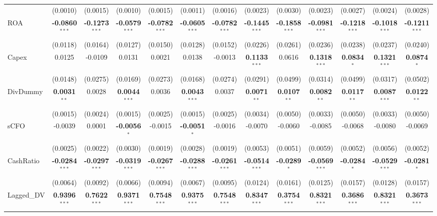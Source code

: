 \documentclass[11pt,a4paper]{article}
\begin{document}
\begin{table}[htbp]
\begin{tabular}{lcccccccccccc}
 & (0.0010) & (0.0015) & (0.0010) & (0.0015) & (0.0011) & (0.0016) & (0.0023) & (0.0030) & (0.0023) & (0.0027) & (0.0024) & (0.0028) \\
ROA & \textbf{-0.0860}$^{***}$ & \textbf{-0.1273}$^{***}$ & \textbf{-0.0579}$^{***}$ & \textbf{-0.0782}$^{***}$ & \textbf{-0.0605}$^{***}$ & \textbf{-0.0782}$^{***}$ & \textbf{-0.1445}$^{***}$ & \textbf{-0.1858}$^{***}$ & \textbf{-0.0981}$^{***}$ & \textbf{-0.1218}$^{***}$ & \textbf{-0.1018}$^{***}$ & \textbf{-0.1211}$^{***}$ \\
 & (0.0118) & (0.0164) & (0.0127) & (0.0150) & (0.0128) & (0.0152) & (0.0226) & (0.0261) & (0.0236) & (0.0238) & (0.0237) & (0.0240) \\
Capex & 0.0125 & -0.0109 & 0.0131 & 0.0021 & 0.0138 & -0.0013 & \textbf{0.1133}$^{***}$ & 0.0616 & \textbf{0.1318}$^{***}$ & \textbf{0.0834}$^{*}$ & \textbf{0.1321}$^{***}$ & \textbf{0.0874}$^{*}$ \\
 & (0.0148) & (0.0275) & (0.0169) & (0.0273) & (0.0168) & (0.0274) & (0.0291) & (0.0499) & (0.0314) & (0.0499) & (0.0317) & (0.0502) \\
DivDummy & \textbf{0.0031}$^{**}$ & 0.0028 & \textbf{0.0044}$^{***}$ & 0.0036 & \textbf{0.0043}$^{***}$ & 0.0037 & \textbf{0.0071}$^{**}$ & \textbf{0.0107}$^{**}$ & \textbf{0.0082}$^{**}$ & \textbf{0.0117}$^{**}$ & \textbf{0.0087}$^{***}$ & \textbf{0.0122}$^{**}$ \\
 & (0.0015) & (0.0024) & (0.0015) & (0.0025) & (0.0015) & (0.0025) & (0.0034) & (0.0050) & (0.0033) & (0.0050) & (0.0033) & (0.0050) \\
sCFO & -0.0039 & 0.0001 & \textbf{-0.0056}$^{*}$ & -0.0015 & \textbf{-0.0051}$^{*}$ & -0.0016 & -0.0070 & -0.0060 & -0.0085 & -0.0068 & -0.0080 & -0.0069 \\
 & (0.0025) & (0.0022) & (0.0030) & (0.0019) & (0.0028) & (0.0019) & (0.0053) & (0.0051) & (0.0059) & (0.0052) & (0.0056) & (0.0052) \\
CashRatio & \textbf{-0.0284}$^{***}$ & \textbf{-0.0297}$^{***}$ & \textbf{-0.0319}$^{***}$ & \textbf{-0.0267}$^{***}$ & \textbf{-0.0288}$^{***}$ & \textbf{-0.0261}$^{***}$ & \textbf{-0.0514}$^{***}$ & \textbf{-0.0289}$^{*}$ & \textbf{-0.0569}$^{***}$ & \textbf{-0.0284}$^{*}$ & \textbf{-0.0529}$^{***}$ & \textbf{-0.0281}$^{*}$ \\
 & (0.0064) & (0.0092) & (0.0066) & (0.0094) & (0.0067) & (0.0095) & (0.0124) & (0.0161) & (0.0125) & (0.0157) & (0.0128) & (0.0157) \\
Lagged\_DV & \textbf{0.9396}$^{***}$ & \textbf{0.7622}$^{***}$ & \textbf{0.9371}$^{***}$ & \textbf{0.7548}$^{***}$ & \textbf{0.9375}$^{***}$ & \textbf{0.7548}$^{***}$ & \textbf{0.8347}$^{***}$ & \textbf{0.3754}$^{***}$ & \textbf{0.8321}$^{***}$ & \textbf{0.3686}$^{***}$ & \textbf{0.8321}$^{***}$ & \textbf{0.3673}$^{***}$ \\

\end{tabular}
\end{table}
\end{document}
